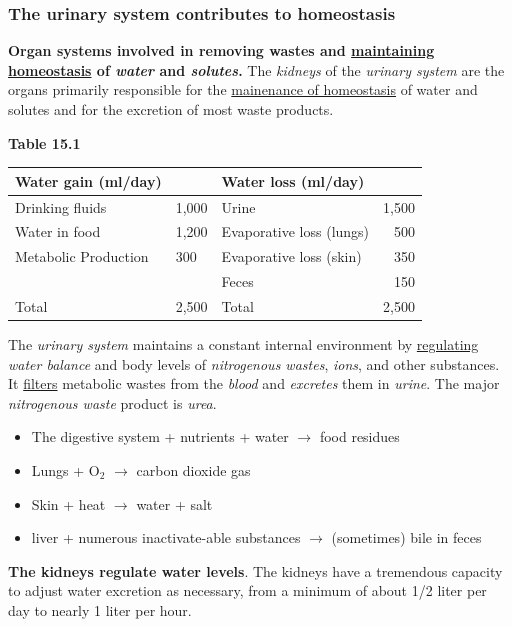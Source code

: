 \documentclass[11pt]{article}
\begin{document}
\subsubsection{The urinary system contributes to homeostasis}
\label{sec:org003e9d6}
\textbf{Organ systems involved in removing wastes and \uline{maintaining homeostasis} of \emph{water}
and \emph{solutes}.} The \emph{kidneys} of the \emph{urinary system} are the organs primarily
responsible for the \uline{mainenance of homeostasis} of water and solutes and for the
excretion of most waste products.

\textbf{Table 15.1} 
\begin{center}
\begin{tabular}{ll|lr|}
\hline
Water gain (ml/day) &  & Water loss (ml/day) & \\
\hline
Drinking fluids & 1,000 & Urine & 1,500\\
Water in food & 1,200 & Evaporative loss (lungs) & 500\\
Metabolic Production & 300 & Evaporative loss (skin) & 350\\
 &  & Feces & 150\\
\hline
Total & 2,500 & Total & 2,500\\
\hline
\end{tabular}
\end{center}


The \emph{urinary system} maintains a constant internal environment by \uline{regulating} \emph{water
balance} and body levels of \emph{nitrogenous wastes}, \emph{ions}, and other substances. It
\uline{filters} metabolic wastes from the \emph{blood} and \emph{excretes} them in \emph{urine}. The major
\emph{nitrogenous waste} product is \emph{urea}.

\begin{itemize}
\item The digestive system + nutrients + water \(\rightarrow\) food residues
\item Lungs + O\(_{\text{2}}\) \(\rightarrow\) carbon dioxide gas
\item Skin + heat \(\rightarrow\) water + salt
\item liver + numerous inactivate-able substances \(\rightarrow\) (sometimes) bile in feces
\end{itemize}


\textbf{The kidneys regulate water levels}. The kidneys have a tremendous capacity to
adjust water excretion as necessary, from a minimum of about 1/2 liter per day
to nearly 1 liter per hour.
\end{document}
